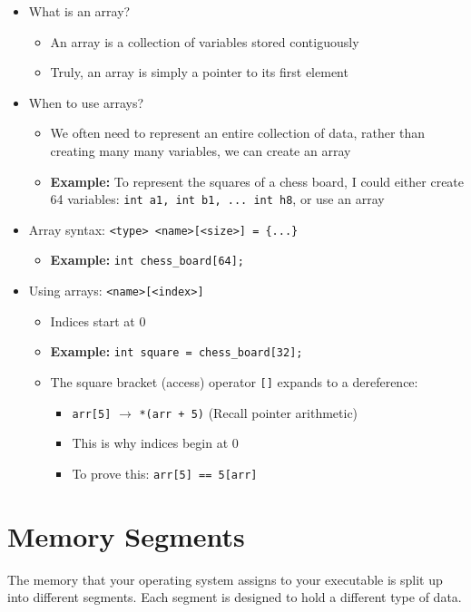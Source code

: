 \documentclass{article}
\begin{document}
\begin{itemize}
	\item What is an array?
	\begin{itemize}
		\item An array is a collection of variables stored contiguously
		\item Truly, an array is simply a pointer to its first element
	\end{itemize}
	\item When to use arrays?
	\begin{itemize}
		\item We often need to represent an entire collection of data, rather than creating many many variables, we can create an array
		\item \textbf{Example:} To represent the squares of a chess board, I could either create 64 variables: \texttt{int a1, int b1, ... int h8}, or use an array
	\end{itemize}
	\item Array syntax: \texttt{<type> <name>[<size>] = \{...\}}
	\begin{itemize}
		\item \textbf{Example:} \texttt{int chess\_board[64];}
	\end{itemize}
	\item Using arrays: \texttt{<name>[<index>]}
	\begin{itemize}
		\item Indices start at 0
		\item \textbf{Example:} \texttt{int square = chess\_board[32];}
		\item The square bracket (access) operator \texttt{[]} expands to a dereference:
		\begin{itemize}
			\item \texttt{arr[5]} $\rightarrow$ \texttt{*(arr + 5)} (Recall pointer arithmetic)
			\item This is why indices begin at 0
			\item To prove this: \texttt{arr[5] == 5[arr]}
		\end{itemize}
	\end{itemize}
	
\end{itemize}

\section{Memory Segments}

\noindent
The memory that your operating system assigns to your executable is split up into different segments. Each segment is designed to hold a different type of data.
\end{document}
